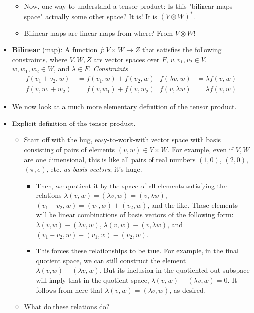 \documentclass[../notes.tex]{subfiles}
\begin{document}
\begin{itemize}
\begin{itemize}
        \item Now, one way to understand a tensor product: Is this "bilinear maps space" actually some other space? It is! It is $(V\otimes W)^*$.
        \item Bilinear maps are linear maps from where? From $V\otimes W$!
    \end{itemize}
    \item \textbf{Bilinear} (map): A function $f:V\times W\to Z$ that satisfies the following constraints, where $V,W,Z$ are vector spaces over $F$, $v,v_1,v_2\in V$, $w,w_1,w_2\in W$, and $\lambda\in F$. \emph{Constraints}
    \begin{align*}
        f(v_1+v_2,w) &= f(v_1,w)+f(v_2,w)&
            f(\lambda v,w) &= \lambda f(v,w)\\
        f(v,w_1+w_2) &= f(v,w_1)+f(v,w_2)&
            f(v,\lambda w) &= \lambda f(v,w)
    \end{align*}
    \item We now look at a much more elementary definition of the tensor product.
    \item Explicit definition of the tensor product.
    \begin{itemize}
        \item Start off with the hug, easy-to-work-with vector space with basis consisting of pairs of elements $(v,w)\in V\times W$. For example, even if $V,W$ are one dimensional, this is like all pairs of real numbers $(1,0)$, $(2,0)$, $(\pi,e)$, etc. \emph{as basis vectors}; it's huge.
        \begin{itemize}
            \item Then, we quotient it by the space of all elements satisfying the relations $\lambda(v,w)=(\lambda v,w)=(v,\lambda w)$, $(v_1+v_2,w)=(v_1,w)+(v_2,w)$, and the like. These elements will be linear combinations of basis vectors of the following form: $\lambda(v,w)-(\lambda v,w)$, $\lambda(v,w)-(v,\lambda w)$, and $(v_1+v_2,w)-(v_1,w)-(v_2,w)$.
            \item This forces these relationships to be true. For example, in the final quotient space, we can still construct the element $\lambda(v,w)-(\lambda v,w)$. But its inclusion in the quotiented-out subspace will imply that in the quotient space, $\lambda(v,w)-(\lambda v,w)=0$. It follows from here that $\lambda(v,w)=(\lambda v,w)$, as desired.
        \end{itemize}
        \item What do these relations do?
        \begin{itemize}

\end{itemize}
\end{itemize}
\end{itemize}
\end{document}
